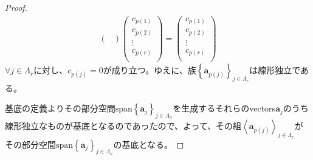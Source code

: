 \documentclass[dvipdfmx]{jsarticle}
\begin{document}
\begin{proof}
\begin{align*}
\begin{pmatrix}
\end{pmatrix}\begin{pmatrix}
c_{p(1)} \\
c_{p(2)} \\
 \vdots \\
c_{p(r)} \\
\end{pmatrix} = \begin{pmatrix}
c_{p(1)} \\
c_{p(2)} \\
 \vdots \\
c_{p(r)} \\
\end{pmatrix}
\end{align*}
$\forall j \in \varLambda_{r}$に対し、$c_{p(j)} = 0$が成り立つ。ゆえに、族$\left\{ \mathbf{a}_{p(j)} \right\}_{j \in \varLambda_{r} } $は線形独立である。\par
基底の定義よりその部分空間${\mathrm{span} }\left\{ \mathbf{a}_{j} \right\}_{j \in \varLambda_{n}}$を生成するそれらのvectors$\mathbf{a}_{j}$のうち線形独立なものが基底となるのであったので、よって、その組$\left\langle \mathbf{a}_{p(j)} \right\rangle_{j \in \varLambda_{r}}$がその部分空間${\mathrm{span} }\left\{ \mathbf{a}_{j} \right\}_{j \in \varLambda_{n}}$の基底となる。
\end{proof}
\end{document}
